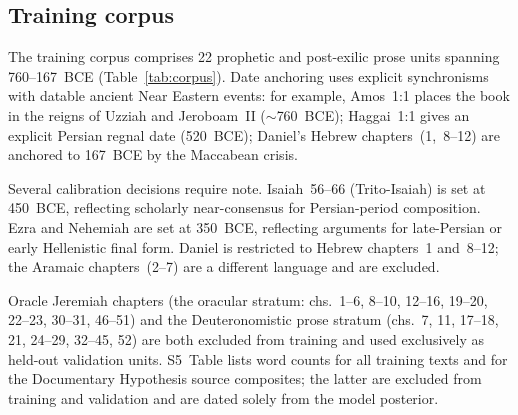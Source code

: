 \documentclass[10pt,letterpaper]{article}
\begin{document}
\subsection*{Training corpus}

The training corpus comprises 22 prophetic and post-exilic prose units
spanning 760--167~BCE (Table~\ref{tab:corpus}).  Date anchoring uses
explicit synchronisms with datable ancient Near Eastern events: for
example, Amos~1:1 places the book in the reigns of Uzziah and Jeroboam~II
($\sim$760~BCE); Haggai~1:1 gives an explicit Persian regnal date
(520~BCE); Daniel's Hebrew chapters~(1,~8--12) are anchored to
167~BCE by the Maccabean crisis.

Several calibration decisions require note.  Isaiah~56--66 (Trito-Isaiah)
is set at 450~BCE, reflecting scholarly near-consensus for Persian-period
composition.  Ezra and Nehemiah are set at 350~BCE, reflecting arguments
for late-Persian or early Hellenistic final form.  Daniel is restricted
to Hebrew chapters~1 and~8--12; the Aramaic chapters~(2--7) are a different
language and are excluded.

Oracle Jeremiah chapters (the oracular stratum: chs.~1--6, 8--10, 12--16,
19--20, 22--23, 30--31, 46--51) and the Deuteronomistic prose stratum
(chs.~7, 11, 17--18, 21, 24--29, 32--45, 52) are both excluded from
training and used exclusively as held-out validation units.  S5~Table
lists word counts for all training texts and for the Documentary Hypothesis
source composites; the latter are excluded from training and validation
and are dated solely from the model posterior.
\end{document}
